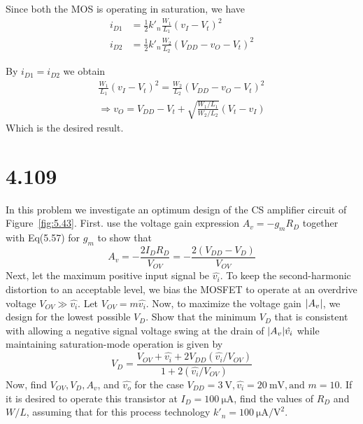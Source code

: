 \documentclass[12pt, a4paper]{article}
\begin{document}
\Ans
Since both the MOS is operating in saturation, we have
\begin{align*}
  i_{D1} &= \frac{1}{2} k'_n \frac{W_1}{L_1} (v_I - V_t)^2 \\
  i_{D2} &= \frac{1}{2} k'_n \frac{W_2}{L_2} (V_{DD} - v_O - V_t)^2 
\end{align*}

By $i_{D1} = i_{D2}$ we obtain
\begin{gather*}
  \frac{W_1}{L_1} (v_I - V_t)^2 = \frac{W_2}{L_2} (V_{DD} - v_O - V_t)^2 \\
  \Rightarrow v_O = V_{DD} - V_t + \sqrt{ \frac{W_1/L_1}{W_2/L_2} } (V_t - v_I) 
\end{gather*}
Which is the desired result.

\section{4.109}
In this problem we investigate an optimum design of the CS amplifier circuit of Figure~\ref{fig:5.43}. First. use the voltage gain expression $A_v = -g_m R_D$ together with Eq(5.57) for $g_m$ to show that
\[ A_v = -\frac{2I_D R_D}{V_{OV}} = - \frac{2(V_{DD} - V_D)}{V_{OV}} \]
Next, let the maximum positive input signal be $\hat{v_i}$. To keep the second-harmonic distortion to an acceptable level, we bias the MOSFET to operate at an overdrive voltage $V_{OV} \gg \hat{v_i}$. Let $V_{OV} = m\hat{v_i}$. Now, to maximize the voltage gain $\lvert A_v\rvert$, we design for the lowest possible $V_D$. Show that the minimum $V_D$ that is consistent with allowing a negative signal voltage swing at the drain of $\lvert A_v\rvert\hat{v_i}$ while maintaining saturation-mode operation is given by
\[
  V_D = \frac{V_{OV} + \hat{v_i} + 2 V_{DD} (\hat{v_i}/V_{OV})}{1 + 2(\hat{v_i}/V_{OV})} 
\]
Now, find $V_{OV}, V_D, A_v$, and $\hat{v_o}$ for the case $V_{DD} = \SI{3}{\V}, \hat{v_i} = \SI{20}{\mV}, \text{and } m = 10$. If it is desired to operate this transistor at $I_D = \SI{100}{\uA}$, find the values of $R_D$ and $W/L$, assuming that for this process technology $k'_n = \SI{100}{\uA\per\V\squared}$.
\end{document}
